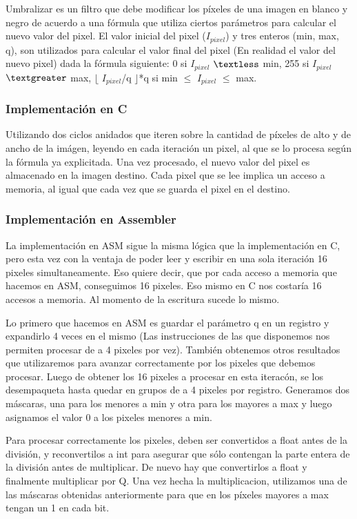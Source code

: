 Umbralizar es un filtro que debe modificar los píxeles de una imagen en blanco y negro de acuerdo a una fórmula que utiliza ciertos parámetros para calcular el nuevo valor del pixel. El valor inicial del pixel ($I_{pixel}$) y tres enteros (min, max, q), son utilizados para calcular el valor final del pixel (En realidad el valor del nuevo pixel) dada la fórmula siguiente: 0 si $I_{pixel}$ $\textless$  min, 255 si $I_{pixel}$ $\textgreater$ max, $\lfloor$ $I_{pixel}$/q $\rfloor$*q si min $\leq$ $I_{pixel}$ $\leq$ max.

\subsubsection{Implementación en C}

Utilizando dos ciclos anidados que iteren sobre la cantidad de píxeles de alto y de ancho de la imágen, leyendo en cada iteración un pixel, al que se lo procesa según la fórmula ya explicitada.
Una vez procesado, el nuevo valor del pixel es almacenado en la imagen destino.
Cada pixel que se lee implica un acceso a memoria, al igual que cada vez que se guarda el pixel en el destino.

\subsubsection{Implementación en Assembler}

La implementación en ASM sigue la misma lógica que la implementación en C, pero esta vez con la ventaja de poder leer y escribir en una sola iteración 16 pixeles simultaneamente. Eso quiere decir, que por cada acceso a memoria que hacemos en ASM, conseguimos 16 pixeles. Eso mismo en C nos costaría 16 accesos a memoria. Al momento de la escritura sucede lo mismo.


Lo primero que hacemos en ASM es guardar el parámetro q en un registro y expandirlo 4 veces en el mismo (Las instrucciones de las que disponemos nos permiten procesar de a 4 pixeles por vez). También obtenemos otros resultados que utilizaremos para avanzar correctamente por los pixeles que debemos procesar.
Luego de obtener los 16 pixeles a procesar en esta iteracón, se los desempaqueta hasta quedar en grupos de a 4 pixeles por registro. Generamos dos máscaras, una para los menores a min y otra para los mayores a max y luego asignamos el valor 0 a los pixeles menores a min.


Para procesar correctamente los pixeles, deben ser convertidos a float antes de la división, y  reconvertilos a int para asegurar que sólo contengan la parte entera de la división antes de multiplicar. De nuevo hay que convertirlos a float y finalmente multiplicar por Q. Una vez hecha la multiplicacion, utilizamos una de las máscaras obtenidas anteriormente para que en los píxeles mayores a max tengan un 1 en cada bit.


